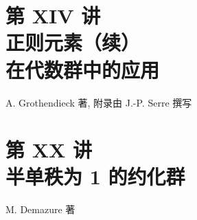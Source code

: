 
\chapter*{第 XIV 讲\\正则元素（续）\\在代数群中的应用}
\begin{center}A. Grothendieck 著, 附录由 J.-P. Serre 撰写\end{center}





\clearpage


\chapter*{第 XX 讲\\半单秩为 1 的约化群}
\begin{center}M. Demazure 著\end{center}

\renewcommand{\thesubsection}{\thesection.\arabic{subsection}}


\renewcommand{\SGAProof}{\par\smallskip\noindent\textit{证明.}\quad}



\providecommand{\rad}{\operatorname{rad}}
\providecommand{\Of}{\operatorname{Of}}
\providecommand{\Transt}{\underline{\operatorname{Transt}}}
\providecommand{\Tor}{\underline{\operatorname{Tor}}}
\providecommand{\Lev}{\underline{\operatorname{Lev}}}
\providecommand{\Par}{\underline{\operatorname{Par}}}
\providecommand{\Crit}{\underline{\operatorname{Crit}}}
\providecommand{\Bor}{\underline{\operatorname{Bor}}}
\providecommand{\Gen}{\underline{\operatorname{Gen}}}
\providecommand{\Opp}{\underline{\operatorname{Opp}}}
\providecommand{\Stand}{\underline{\operatorname{Stand}}}
\providecommand{\TypeStand}{\underline{\operatorname{TypeStand}}}
\providecommand{\Int}{\operatorname{int}}
\renewcommand{\Centr}{\underline{\operatorname{Centr}}}
\renewcommand{\Norm}{\underline{\operatorname{Norm}}}

\clearpage

